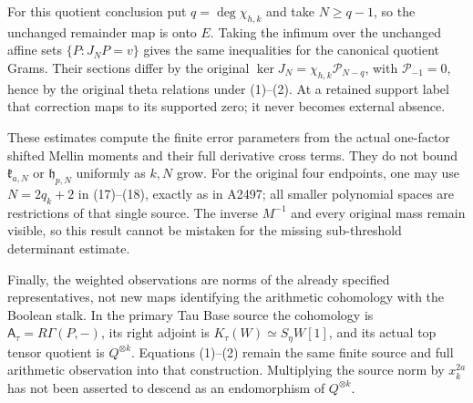 \documentclass[11pt]{article}
\begin{document}
For this quotient conclusion put \(q=\deg\chi_{h,k}\) and take
\(N\ge q-1\), so the unchanged remainder map is onto \(E\).
Taking the infimum over the unchanged affine sets
\(\{P:J_NP=v\}\) gives the same inequalities for the canonical
quotient Grams. Their sections differ by the original
\(\ker J_N=\chi_{h,k}\mathcal P_{N-q}\), with
\(\mathcal P_{-1}=0\), hence by the original theta
relations under (1)--(2). At a retained support label that correction
maps to its supported zero; it never becomes external absence.

These estimates compute the finite error parameters from the actual
one-factor shifted Mellin moments and their full derivative cross
terms. They do not bound \(\mathfrak k_{a,N}\) or
\(\mathfrak h_{p,N}\) uniformly as \(k,N\) grow. For the original
four endpoints, one may use \(N=2q_k+2\) in (17)--(18), exactly as
in A2497; all smaller polynomial spaces are restrictions of that
single source. The inverse \(M^{-1}\) and every original mass remain
visible, so this result cannot be mistaken for the missing
sub-threshold determinant estimate.

Finally, the weighted observations are norms of the already specified
representatives, not new maps identifying the arithmetic cohomology
with the Boolean stalk. In the primary Tau Base source the cohomology
is \(\mathsf A_\tau=R\Gamma(P,-)\), its right adjoint is
\(K_\tau(W)\simeq S_\eta W[1]\), and its actual top tensor quotient
is \(Q^{\otimes k}\). Equations (1)--(2) remain the same finite source
and full arithmetic observation into that construction. Multiplying
the source norm by \(x_k^{2a}\) has not been asserted to descend as
an endomorphism of \(Q^{\otimes k}\).
\end{document}
